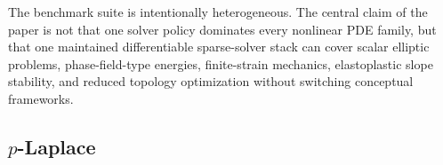 \label{sec:benchmarks}

The benchmark suite is intentionally heterogeneous. The central claim of the
paper is not that one solver policy dominates every nonlinear PDE family, but
that one maintained differentiable sparse-solver stack can cover scalar
elliptic problems, phase-field-type energies, finite-strain mechanics,
elastoplastic slope stability, and reduced topology optimization without
switching conceptual frameworks.

\begin{table}[H]
  \centering
  
  \caption{Benchmark families, stopping rules, and principal comparison paths.
  The later numerical section revisits the same families from the timing and
  scaling viewpoint.}
  \label{tab:benchmark-spec}
\end{table}

\begin{table}[H]
  \centering
  
  \caption{Availability of \fenics{} and \purejax{} references. Reference
  paths are used where the repository already provides documented implementations;
  absent cells are left absent rather than filled with speculative baselines.}
  \label{tab:reference-availability}
\end{table}

\subsection{\texorpdfstring{$p$-Laplace}{p-Laplace}}
\label{sec:bench-plaplace}

